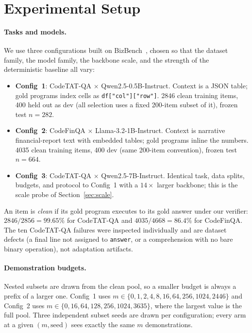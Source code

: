 \section{Experimental Setup}
\label{sec:setup}

\paragraph{Tasks and models.}
We use three configurations built on BizBench~\cite{bizbench2024}, chosen so
that the dataset family, the model family, the backbone scale, and the strength
of the deterministic baseline all vary:

\begin{itemize}\itemsep2pt
\item \textbf{Config~1}: CodeTAT-QA $\times$ Qwen2.5-0.5B-Instruct. Context is a
JSON table; gold programs index cells as \texttt{df["col"]["row"]}. 2846 clean
training items, 400 held out as dev (all selection uses a fixed 200-item subset
of it), frozen test $n{=}282$.
\item \textbf{Config~2}: CodeFinQA $\times$ Llama-3.2-1B-Instruct. Context is
narrative financial-report text with embedded tables; gold programs inline the
numbers. 4035 clean training items, 400 dev (same 200-item convention), frozen
test $n{=}664$.
\item \textbf{Config~3}: CodeTAT-QA $\times$ Qwen2.5-7B-Instruct. Identical
task, data splits, budgets, and protocol to Config~1 with a $14\times$ larger
backbone; this is the scale probe of Section~\ref{sec:scale}.
\end{itemize}

An item is \emph{clean} if its gold program executes to its gold answer under
our verifier: $2846/2856 = 99.65\%$ for CodeTAT-QA and $4035/4668 = 86.4\%$ for
CodeFinQA. The ten CodeTAT-QA failures were inspected individually and are
dataset defects (a final line not assigned to \texttt{answer}, or a
comprehension with no bare binary operation), not adaptation artifacts.

\paragraph{Demonstration budgets.}
Nested subsets are drawn from the clean pool, so a smaller budget is always a
prefix of a larger one. Config~1 uses
$m \in \{0,1,2,4,8,16,64,256,1024,2446\}$ and Config~2 uses
$m \in \{0,16,64,128,256,1024,3635\}$, where the largest value is the full
pool. Three independent subset seeds are drawn per configuration; every arm at
a given $(m, \text{seed})$ sees exactly the same $m$ demonstrations.

